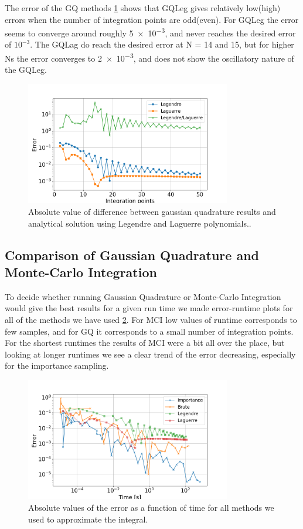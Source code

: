 The error of the GQ methods \cref{fig:gauss_error} shows that GQLeg gives relatively
low(high) errors when the number of integration points are odd(even). For GQLeg
the error seems to converge around roughly \num{ 5e-3}, and never reaches the
desired error of $10^{-3}$. The GQLag do reach the desired error at N = 14 and 15,
but for higher Ns the error converges to \num{2e-3}, and does not show the oscillatory
nature of the GQLeg.

\begin{figure}[H]
  \centering
  \includegraphics[width=0.8\textwidth]{../figures/gauss_error.png}
  \caption{Absolute value of difference between gaussian quadrature results and analytical
  solution using Legendre and Laguerre polynomials..}

  \label{fig:gauss_error}
\end{figure}


\subsection{Comparison of Gaussian Quadrature and Monte-Carlo Integration}

To decide whether running Gaussian Quadrature or Monte-Carlo Integration would
give the best results for a given run time we made error-runtime plots for all
of the methods we have used \cref{fig:time_compare}. For MCI low values of runtime
corresponds to few samples, and for GQ it corresponds to a small number of integration points.
For the shortest runtimes the results of MCI were a bit all over the place, but
looking at longer runtimes we see a clear trend of the error decreasing, especially
for the importance sampling.


\begin{figure}[H]
  \centering
  \includegraphics[width=0.8\textwidth]{../figures/time_compare.png}
  \caption{Absolute values of the error as a function of time for all methods we
  used to approximate the integral.}

  \label{fig:time_compare}
\end{figure}
